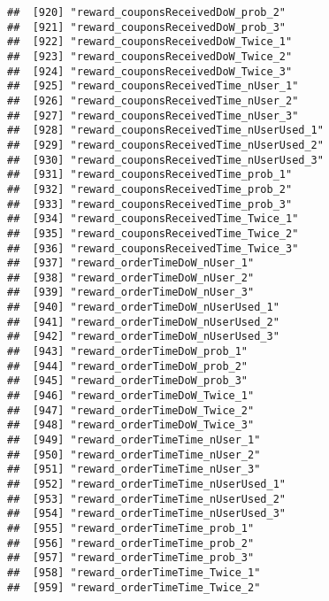 \documentclass[10pt]{report}
\begin{document}
\begin{verbatim}
##  [920] "reward_couponsReceivedDoW_prob_2"                     
##  [921] "reward_couponsReceivedDoW_prob_3"                     
##  [922] "reward_couponsReceivedDoW_Twice_1"                    
##  [923] "reward_couponsReceivedDoW_Twice_2"                    
##  [924] "reward_couponsReceivedDoW_Twice_3"                    
##  [925] "reward_couponsReceivedTime_nUser_1"                   
##  [926] "reward_couponsReceivedTime_nUser_2"                   
##  [927] "reward_couponsReceivedTime_nUser_3"                   
##  [928] "reward_couponsReceivedTime_nUserUsed_1"               
##  [929] "reward_couponsReceivedTime_nUserUsed_2"               
##  [930] "reward_couponsReceivedTime_nUserUsed_3"               
##  [931] "reward_couponsReceivedTime_prob_1"                    
##  [932] "reward_couponsReceivedTime_prob_2"                    
##  [933] "reward_couponsReceivedTime_prob_3"                    
##  [934] "reward_couponsReceivedTime_Twice_1"                   
##  [935] "reward_couponsReceivedTime_Twice_2"                   
##  [936] "reward_couponsReceivedTime_Twice_3"                   
##  [937] "reward_orderTimeDoW_nUser_1"                          
##  [938] "reward_orderTimeDoW_nUser_2"                          
##  [939] "reward_orderTimeDoW_nUser_3"                          
##  [940] "reward_orderTimeDoW_nUserUsed_1"                      
##  [941] "reward_orderTimeDoW_nUserUsed_2"                      
##  [942] "reward_orderTimeDoW_nUserUsed_3"                      
##  [943] "reward_orderTimeDoW_prob_1"                           
##  [944] "reward_orderTimeDoW_prob_2"                           
##  [945] "reward_orderTimeDoW_prob_3"                           
##  [946] "reward_orderTimeDoW_Twice_1"                          
##  [947] "reward_orderTimeDoW_Twice_2"                          
##  [948] "reward_orderTimeDoW_Twice_3"                          
##  [949] "reward_orderTimeTime_nUser_1"                         
##  [950] "reward_orderTimeTime_nUser_2"                         
##  [951] "reward_orderTimeTime_nUser_3"                         
##  [952] "reward_orderTimeTime_nUserUsed_1"                     
##  [953] "reward_orderTimeTime_nUserUsed_2"                     
##  [954] "reward_orderTimeTime_nUserUsed_3"                     
##  [955] "reward_orderTimeTime_prob_1"                          
##  [956] "reward_orderTimeTime_prob_2"                          
##  [957] "reward_orderTimeTime_prob_3"                          
##  [958] "reward_orderTimeTime_Twice_1"                         
##  [959] "reward_orderTimeTime_Twice_2"                         

\end{verbatim}
\end{document}

